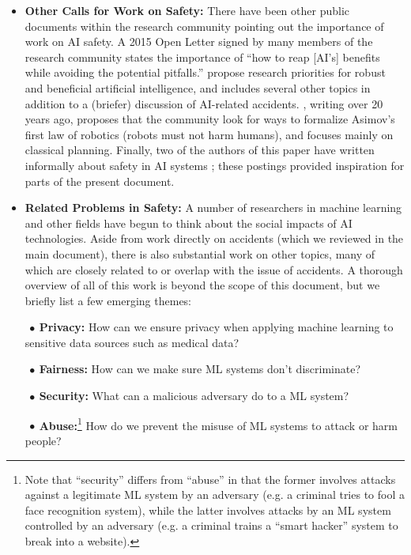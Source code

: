 \documentclass[a4paper,10pt]{article}
\begin{document}
\begin{itemize}
\item {\bf Other Calls for Work on Safety:}  There have been other public documents within the research community pointing out the importance of work on AI safety.  A 2015 Open Letter \cite{OpenLetter} signed by many members of the research community states the importance of ``how to reap [AI’s] benefits while avoiding the potential pitfalls.''  \cite{russell2015research} propose research priorities for robust and beneficial artificial intelligence, and includes several other topics in addition to a (briefer) discussion of AI-related accidents.  \cite{weld1994first}, writing over 20 years ago, proposes that the community look for ways to formalize Asimov’s first law of robotics (robots must not harm humans), and focuses mainly on classical planning. Finally, two of the authors of this paper have written informally about safety in AI systems \cite{steinhardt2015longterm,christiano2016control}; these postings provided inspiration for parts of the present document.

\item {\bf Related Problems in Safety:} A number of researchers in machine learning and other fields have begun to think about the social impacts of AI technologies.  Aside from work directly on accidents (which we reviewed in the main document), there is also substantial work on other topics, many of which are closely related to or overlap with the issue of accidents.  A thorough overview of all of this work is beyond the scope of this document, but we briefly list a few emerging themes:

{\setlength{\parskip}{0.12cm}
$~\bullet~${\bf Privacy:} How can we ensure privacy when applying machine learning to sensitive data sources such as medical data? \cite{ji2014differential,abadi2016deep}

$~\bullet~${\bf Fairness:} How can we make sure ML systems don’t discriminate? \cite{adebayo2014hidden,zafar2015learning,ajunwa2016hiring,dwork2012fairness,pedreshi2008discrimination,zemel2013learning}

$~\bullet~${\bf Security:} What can a malicious adversary do to a ML system? \cite{steinhardt2016avoiding,mei2015security,mei2015using,papernot2016practical,nguyen2015deep,barreno2010security}

$~\bullet~${\bf Abuse:}\footnote{Note that ``security'' differs from ``abuse'' in that the former involves attacks against a legitimate ML system by an adversary (e.g. a criminal tries to fool a face recognition system), while the latter involves attacks by an ML system controlled by an adversary (e.g. a criminal trains a ``smart hacker'' system to break into a website).} How do we prevent the misuse of ML systems to attack or harm people? \cite{OpenLetterWeapons}

}
\end{itemize}
\end{document}
